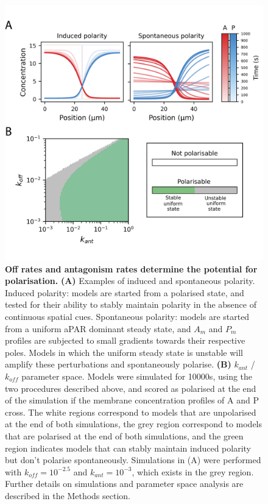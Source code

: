 \documentclass[12pt]{"report"}
\newcommand{\mycaption}[2]{\caption[#1]{\textbf{#1.} #2}}
\begin{document}
\begin{figure}
\includegraphics[scale=1]{goehring_model_kant_koff_triggering}
\centering
\mycaption{Off rates and antagonism rates determine the potential for polarisation}{
\textbf{(A)} Examples of induced and spontaneous polarity. Induced polarity: models are started from a polarised state, and tested for their ability to stably maintain polarity in the absence of continuous spatial cues. Spontaneous polarity: models are started from a uniform aPAR dominant steady state, and $A_m$ and $P_m$ profiles are subjected to small gradients towards their respective poles. Models in which the uniform steady state is unstable will amplify these perturbations and spontaneously polarise.
\textbf{(B)} $k_{ant}$ / $k_{off}$ parameter space. Models were simulated for 10000s, using the two procedures described above, and scored as polarised at the end of the simulation if the membrane concentration profiles of A and P cross. The white regions correspond to models that are unpolarised at the end of both simulations, the grey region correspond to models that are polarised at the end of both simulations, and the green region indicates models that can stably maintain induced polarity but don't polarise spontaneously. Simulations in (A) were performed with $k_{off} = 10^{-2.5}$ and $k_{ant} = 10^{-3}$, which exists in the grey region. Further details on simulations and parameter space analysis are described in the Methods section.
}
\label{fig:goehring_model_kant_koff_triggering}
\end{figure}
\end{document}
